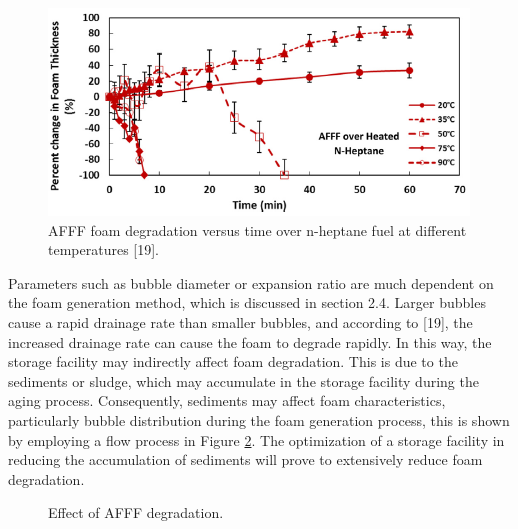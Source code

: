 \documentclass[12pt]{report}
\begin{document}
\begin{figure}[H]
    \centering
    \includegraphics[width=\textwidth]{foam_degradation.png}
    \caption{AFFF foam degradation versus time over n-heptane fuel at different temperatures [19].}
    \label{ch2:figure:degradation}
\end{figure}

Parameters such as bubble diameter or expansion ratio are much dependent on the foam generation method, which is discussed in section 2.4. Larger bubbles cause a rapid drainage rate than smaller bubbles, and according to [19], the increased drainage rate can cause the foam to degrade rapidly. In this way, the storage facility may indirectly affect foam degradation. This is due to the sediments or sludge, which may accumulate in the storage facility during the aging process. Consequently, sediments may affect foam characteristics, particularly bubble distribution during the foam generation process, this is shown by employing a flow process in Figure \ref{ch2:figure:effect}. The optimization of a storage facility in reducing the accumulation of sediments will prove to extensively reduce foam degradation.

\begin{figure}[H]

\centering
\begin{adjustbox}{center}
\end{adjustbox}

\caption{Effect of AFFF degradation.}
\label{ch2:figure:effect}
\end{figure}
\end{document}
